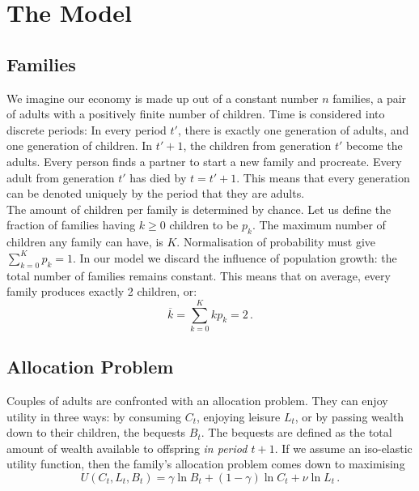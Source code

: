 \section{The Model}

\subsection{Families}
We imagine our economy is made up out of a constant number $n$ families, a pair of adults with a positively finite number of children. Time is considered into discrete periods: In every period $t'$, there is exactly one generation of adults, and one generation of children. In $t'+1$, the children from generation $t'$ become the adults. Every person finds a partner to start a new family and procreate. Every adult from generation $t'$ has died by $t=t'+1$. This means that every generation can be denoted uniquely by the period that they are adults. \\
The amount of children per family is determined by chance. Let us define the fraction of families having $k\geq 0$ children to be $p_k$. The maximum number of children any family can have, is $K$. Normalisation of probability must give $\sum_{k=0}^K p_k = 1$. In our model we discard the influence of population growth: the total number of families remains constant. This means that on average, every family produces exactly 2 children, or:
\begin{equation}
    \overline{k} = \sum_{k=0}^K k p_k = 2 \,.
\end{equation}

\subsection{Allocation Problem}
Couples of adults are confronted with an allocation problem. They can enjoy utility in three ways: by consuming $C_t$, enjoying leisure $L_t$, or by passing wealth down to their children, the bequests $B_t$. The bequests are defined as the total amount of wealth available to offspring \emph{in period $t+1$}. If we assume an iso-elastic utility function, then the family's allocation problem comes down to maximising
\begin{equation}
    U(C_t,L_t,B_t) = \gamma \ln B_t + (1-\gamma) \ln C_t + \nu \ln L_t\,.
    \label{eq:U}
\end{equation}

